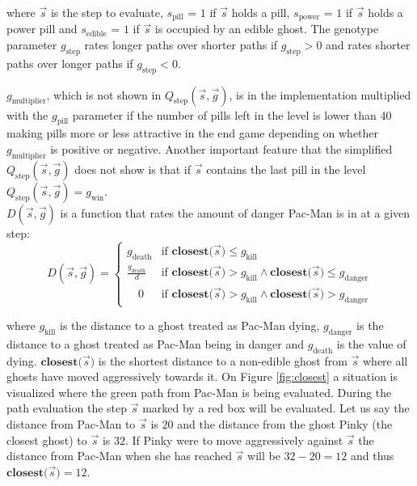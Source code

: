 \documentclass[conference]{IEEEtran}
\begin{document}
where $\vec{s}$ is the step to evaluate, $s_{\mathrm{pill}}$ = $1$ if $\vec{s}$ holds a pill, $s_{\mathrm{power}}$ = $1$ if $\vec{s}$ holds a power pill and $s_{\mathrm{edible}}$ = $1$ if $\vec{s}$ is occupied by an edible ghost. The genotype parameter $g_{\mathrm{step}}$ rates longer paths over shorter paths if $g_{\mathrm{step}} > 0$ and rates shorter paths over longer paths if $g_{\mathrm{step}} < 0$. 

$g_{\mathrm{multiplier}}$, which is not shown in $Q_{\mathrm{step}}(\vec{s}, \vec{g})$, is in the implementation multiplied with the $g_{\mathrm{pill}}$ parameter if the number of pills left in the level is lower than 40 making pills more or less attractive in the end game depending on whether $g_{\mathrm{multiplier}}$ is positive or negative. Another important feature that the simplified $Q_{\mathrm{step}}(\vec{s}, \vec{g})$ does not show is that if $\vec{s}$ contains the last pill in the level $Q_{\mathrm{step}}(\vec{s}, \vec{g}) = g_{\mathrm{win}}$.\\

$D(\vec{s}, \vec{g})$ is a function that rates the amount of danger Pac-Man is in at a given step:
\[
 D(\vec{s}, \vec{g}) = 
  \begin{cases}
   g_{\mathrm{death}} 				& \text{if } \mathbf{closest(}\vec{s}) \leq g_{\mathrm{kill}} \\
   \frac{g_{\mathrm{death}}}{d}  	& \text{if } \mathbf{closest(}\vec{s}) > g_{\mathrm{kill}} \land \mathbf{closest(}\vec{s}) \leq g_{\mathrm{danger}} \\
   \,\,\,\,\,\,0			& \text{if } \mathbf{closest(}\vec{s}) > g_{\mathrm{kill}} \land \mathbf{closest(}\vec{s}) > g_{\mathrm{danger}}
  \end{cases}
\]	

where $g_{\mathrm{kill}}$ is the distance to a ghost treated as Pac-Man dying, $g_{\mathrm{danger}}$ is the distance to a ghost treated as Pac-Man being in danger and $g_{\mathrm{death}}$ is the value of dying. $\mathbf{closest(}\vec{s})$ is the shortest distance to a non-edible ghost from $\vec{s}$ where all ghosts have moved aggressively towards it. On Figure \ref{fig:closest} a situation is visualized where the green path from Pac-Man is being evaluated. During the path evaluation the step $\vec{s}$ marked by a red box will be evaluated. Let us say the distance from Pac-Man to $\vec{s}$ is $20$ and the distance from the ghost Pinky (the closest ghost) to $\vec{s}$ is $32$. If Pinky were to move aggressively against $\vec{s}$ the distance from Pac-Man when she has reached $\vec{s}$ will be $32-20=12$ and thus $\mathbf{closest(}\vec{s}) = 12$.
\end{document}
